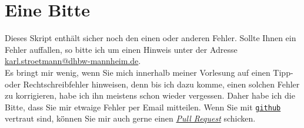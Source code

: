 \section{Eine Bitte}
Dieses Skript enth\"alt sicher noch den einen oder anderen Fehler.  Sollte Ihnen ein Fehler auffallen, so bitte ich
um einen Hinweis unter der Adresse
\\[0.2cm]
\hspace*{1.3cm}
\href{mailto:karl.stroetmann@dhbw-mannheim.de}{karl.stroetmann@dhbw-mannheim.de}.
\\[0.2cm]
Es bringt mir wenig, wenn Sie mich innerhalb meiner Vorlesung auf einen Tipp- oder
Rechtschreibfehler hinweisen, denn bis ich dazu komme, einen solchen Fehler zu korrigieren, habe ich
ihn meistens schon wieder vergessen.  Daher habe ich die Bitte, dass Sie mir etwaige Fehler per Email mitteilen.
Wenn Sie mit \href{http://github.com}{\texttt{github}} vertraut sind, k\"\"onnen Sie mir auch gerne einen
\href{https://help.github.com/articles/using-pull-requests}{\textsl{Pull Request}} schicken.


